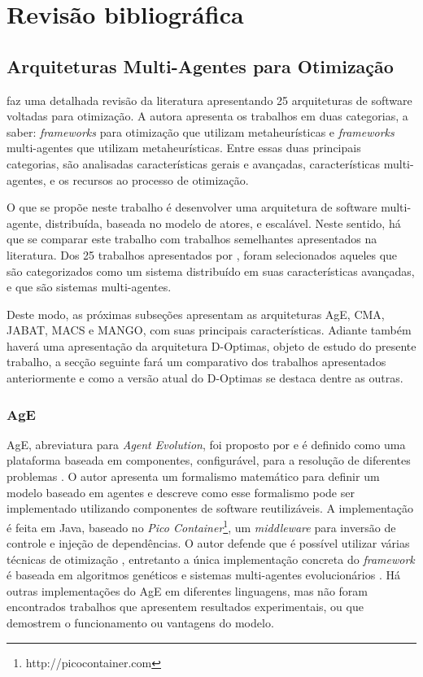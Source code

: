\chapter{Revisão bibliográfica}
\label{chap:revisao}

\section{Arquiteturas Multi-Agentes para Otimização}
 faz uma detalhada revisão da literatura apresentando 25 arquiteturas de software voltadas para otimização. 
A autora apresenta os trabalhos em duas categorias, a saber: \textit{frameworks} para otimização que utilizam metaheurísticas e \textit{frameworks} multi-agentes que utilizam metaheurísticas. Entre essas duas principais categorias, são analisadas características gerais e avançadas, características multi-agentes, e os recursos ao processo de otimização. 

O que se propõe neste trabalho é desenvolver uma arquitetura de software multi-agente, distribuída, baseada no modelo de atores, e escalável. Neste sentido, há que se comparar este trabalho com trabalhos semelhantes apresentados na literatura. Dos 25 trabalhos apresentados por , foram selecionados aqueles que são categorizados como um sistema distribuído em suas características avançadas, e que são sistemas multi-agentes.

Deste modo, as próximas subseções apresentam as arquiteturas AgE, CMA, JABAT, MACS e MANGO, com suas principais características. Adiante também haverá uma apresentação da arquitetura D-Optimas, objeto de estudo do presente trabalho, a secção seguinte fará um comparativo dos trabalhos apresentados anteriormente e como a versão atual do D-Optimas se destaca dentre as outras.

\subsection{AgE}
AgE, abreviatura para \textit{Agent Evolution}, foi proposto por  e é definido como uma plataforma baseada em componentes, configurável, para a resolução de diferentes problemas \cite{piketak2009functional}. O autor apresenta um formalismo matemático para definir um modelo baseado em agentes e descreve como esse formalismo pode ser implementado utilizando componentes de software reutilizáveis. A implementação é feita em Java, baseado no \textit{Pico Container}\footnote{http://picocontainer.com}, um \textit{middleware} para inversão de controle e injeção de dependências. O autor defende que é possível utilizar várias técnicas de otimização \cite{piketak2013agent}, entretanto a única implementação concreta do \textit{framework} é baseada em algoritmos genéticos e sistemas multi-agentes evolucionários \cite{kisiel2004agent}. Há outras implementações do AgE em diferentes linguagens, mas não foram encontrados trabalhos que apresentem resultados experimentais, ou que demostrem o funcionamento ou vantagens do modelo. 

